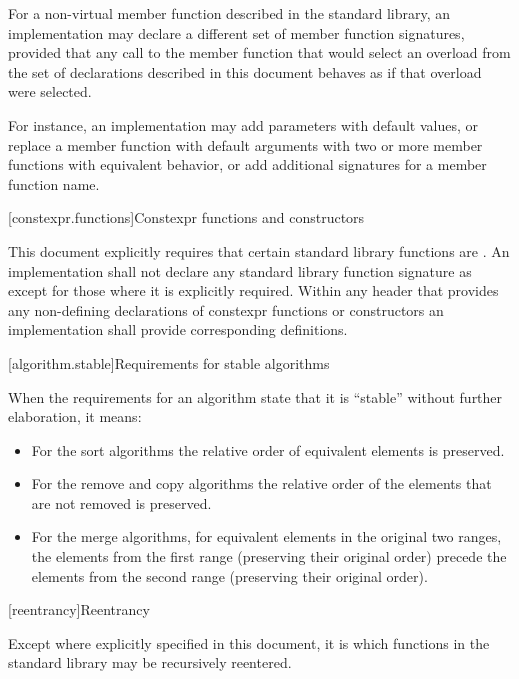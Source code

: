 \pnum
For a non-virtual member function described in the \Cpp{} standard library,
an implementation may declare a different set of member function signatures,
provided that any call to the member function that would select
an overload from the set of declarations described in this document
behaves as if that overload were selected.
\begin{note}
For instance, an implementation may add parameters with default values,
or replace a member function with default arguments
with two or more member functions with equivalent behavior,
or add additional signatures for a member function name.
\end{note}

[constexpr.functions]{Constexpr functions and constructors}

\pnum
This document explicitly requires that certain standard library functions are
. An implementation shall not declare
any standard library function signature as  except for those where
it is explicitly required.
Within any header that provides any non-defining declarations of constexpr
functions or constructors an implementation shall provide corresponding definitions.

[algorithm.stable]{Requirements for stable algorithms}

\pnum
{}%
%
When the requirements for an algorithm state that it is ``stable'' without further elaboration,
it means:

\begin{itemize}
\item For the sort algorithms the relative order of equivalent
elements is preserved.

\item For the remove and copy algorithms the relative order of
the elements that are not removed is preserved.

\item For the merge algorithms, for equivalent elements in
the original two ranges, the elements from the first range (preserving their
original order) precede the elements from the second range (preserving their
original order).
\end{itemize}

[reentrancy]{Reentrancy}

\pnum
Except where explicitly specified in this document, it is  which functions in the \Cpp{} standard
library may be recursively reentered.

